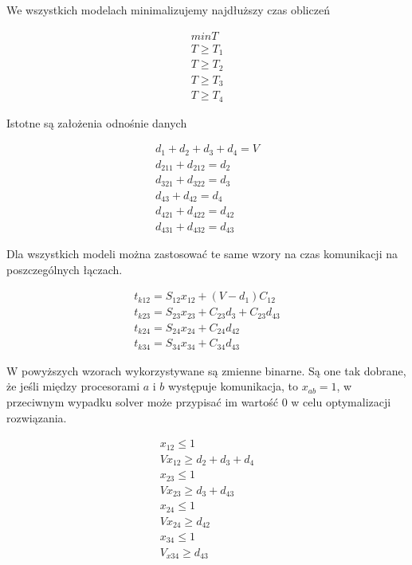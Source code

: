 We wszystkich modelach minimalizujemy najdłuższy czas obliczeń

\begin{equation} \label{eq:min}
\begin{array}{l}
min T \\
T \geq T_{1} \\
T \geq T_{2} \\
T \geq T_{3} \\
T \geq T_{4}
\end{array}
\end{equation}

Istotne są założenia odnośnie danych

\begin{equation} \label{eq:data}
\begin{array}{l}
d_{1} + d_{2} + d_{3} + d_{4} = V \\
d_{211} + d_{212} = d_{2} \\
d_{321} + d_{322} = d_{3} \\
d_{43} + d_{42} = d_{4} \\
d_{421} + d_{422} = d_{42} \\
d_{431} + d_{432} = d_{43}
\end{array}
\end{equation}

Dla wszystkich modeli można zastosować te same wzory na czas komunikacji na poszczególnych łączach.

\begin{equation} \label{eq:tk}
\begin{array}{l}
t_{k12} = S_{12}x_{12} + (V - d_{1})C_{12} \\
t_{k23} = S_{23}x_{23} + C_{23}d_{3} + C_{23}d_{43} \\
t_{k24} = S_{24}x_{24} + C_{24}d_{42} \\
t_{k34} = S_{34}x_{34} + C_{34}d_{43}
\end{array}
\end{equation}

W powyższych wzorach wykorzystywane są zmienne binarne. Są one tak dobrane, że jeśli między procesorami $a$ i $b$ występuje komunikacja,
to $x_{ab} = 1$, w przeciwnym wypadku solver może przypisać im wartość $0$ w celu optymalizacji rozwiązania.

\begin{equation} \label{eq:x}
\begin{array}{l}
x_{12} \leq 1 \\
Vx_{12} \geq d_{2} + d_{3} + d_{4} \\
x_{23} \leq 1 \\
Vx_{23} \geq d_{3} + d_{43} \\
x_{24} \leq 1 \\
Vx_{24} \geq d_{42} \\
x_{34} \leq 1 \\
V_{x34} \geq d_{43}
\end{array}
\end{equation}

